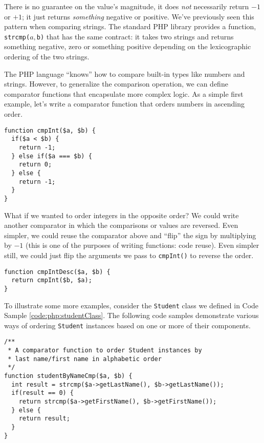 There is no guarantee on the value's magnitude, it does \emph{not}
necessarily return $-1$ or $+1$; it just returns \emph{something} negative or
positive.  We've previously seen this pattern when comparing strings.  The
standard PHP library provides a function, \texttt{strcmp($a, $b)} that
has the same contract: it takes two strings and returns something
negative, zero or something positive depending on the lexicographic ordering
of the two strings.  

The PHP language ``knows'' how to compare built-in types like numbers
and strings.  However, to generalize the comparison operation, 
we can define comparator functions that encapsulate more complex logic.
As a simple first example, let's write a comparator function that orders 
numbers in ascending order.  

\begin{verbatim}
function cmpInt($a, $b) {
  if($a < $b) {
    return -1;
  } else if($a === $b) {
    return 0;
  } else {
    return -1;
  }
}
\end{verbatim}

What if we wanted to order integers in the opposite order?  We could write
another comparator in which the comparisons or values are reversed.  Even
simpler, we could reuse the comparator above and ``flip'' the sign by 
multiplying by $-1$ (this is one of the purposes of writing functions:
code reuse).  Even simpler still, we could just flip the arguments we pass to 
\texttt{cmpInt()} to reverse the order.

\begin{verbatim}
function cmpIntDesc($a, $b) {
  return cmpInt($b, $a);
}
\end{verbatim}

To illustrate some more examples, consider the \texttt{Student} class
we defined in Code Sample \ref{code:php:studentClass}.  The following code
samples demonstrate various ways of ordering \texttt{Student} 
instances based on one or more of their components.

\begin{verbatim}
/**
 * A comparator function to order Student instances by 
 * last name/first name in alphabetic order
 */
function studentByNameCmp($a, $b) {
  int result = strcmp($a->getLastName(), $b->getLastName());
  if(result == 0) {
    return strcmp($a->getFirstName(), $b->getFirstName());
  } else {
    return result;
  }
}
\end{verbatim}

